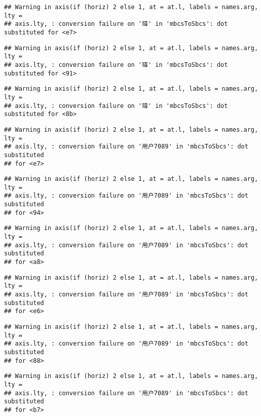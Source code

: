 \documentclass[
]{article}
\begin{document}
\begin{verbatim}
## Warning in axis(if (horiz) 2 else 1, at = at.l, labels = names.arg, lty =
## axis.lty, : conversion failure on '瑋' in 'mbcsToSbcs': dot substituted for <e7>
\end{verbatim}

\begin{verbatim}
## Warning in axis(if (horiz) 2 else 1, at = at.l, labels = names.arg, lty =
## axis.lty, : conversion failure on '瑋' in 'mbcsToSbcs': dot substituted for <91>
\end{verbatim}

\begin{verbatim}
## Warning in axis(if (horiz) 2 else 1, at = at.l, labels = names.arg, lty =
## axis.lty, : conversion failure on '瑋' in 'mbcsToSbcs': dot substituted for <8b>
\end{verbatim}

\begin{verbatim}
## Warning in axis(if (horiz) 2 else 1, at = at.l, labels = names.arg, lty =
## axis.lty, : conversion failure on '用户7089' in 'mbcsToSbcs': dot substituted
## for <e7>
\end{verbatim}

\begin{verbatim}
## Warning in axis(if (horiz) 2 else 1, at = at.l, labels = names.arg, lty =
## axis.lty, : conversion failure on '用户7089' in 'mbcsToSbcs': dot substituted
## for <94>
\end{verbatim}

\begin{verbatim}
## Warning in axis(if (horiz) 2 else 1, at = at.l, labels = names.arg, lty =
## axis.lty, : conversion failure on '用户7089' in 'mbcsToSbcs': dot substituted
## for <a8>
\end{verbatim}

\begin{verbatim}
## Warning in axis(if (horiz) 2 else 1, at = at.l, labels = names.arg, lty =
## axis.lty, : conversion failure on '用户7089' in 'mbcsToSbcs': dot substituted
## for <e6>
\end{verbatim}

\begin{verbatim}
## Warning in axis(if (horiz) 2 else 1, at = at.l, labels = names.arg, lty =
## axis.lty, : conversion failure on '用户7089' in 'mbcsToSbcs': dot substituted
## for <88>
\end{verbatim}

\begin{verbatim}
## Warning in axis(if (horiz) 2 else 1, at = at.l, labels = names.arg, lty =
## axis.lty, : conversion failure on '用户7089' in 'mbcsToSbcs': dot substituted
## for <b7>
\end{verbatim}
\end{document}
